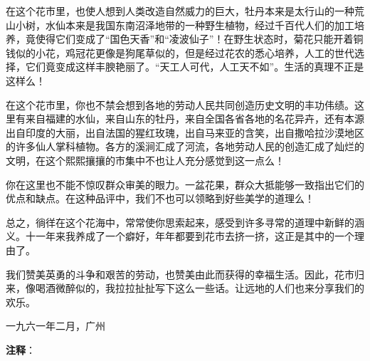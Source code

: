 \documentclass[12pt,UTF-8,openany]{ctexbook}
\begin{document}
\begin{large}
    在这个花市里，也使人想到人类改造自然威力的巨大，牡丹本来是太行山的一种荒山小树，水仙本来是我国东南沼泽地带的一种野生植物，经过千百代人们的加工培养，竟使得它们变成了“国色天香”和“凌波仙子”！在野生状态时，菊花只能开着铜钱似的小花，鸡冠花更像是狗尾草似的，但是经过花农的悉心培养，人工的世代选择，它们竟变成这样丰腴艳丽了。“天工人可代，人工天不如”。生活的真理不正是这样么！
    
    在这个花市里，你也不禁会想到各地的劳动人民共同创造历史文明的丰功伟绩。这里有来自福建的水仙，来自山东的牡丹，来自全国各省各地的名花异卉，还有本源出自印度的大丽，出自法国的猩红玫瑰，出自马来亚的含笑，出自撒哈拉沙漠地区的许多仙人掌科植物。各方的溪涧汇成了河流，各地劳动人民的创造汇成了灿烂的文明，在这个熙熙攘攘的市集中不也让人充分感觉到这一点么！
    
    你在这里也不能不惊叹群众审美的眼力。一盆花果，群众大抵能够一致指出它们的优点和缺点。在这种品评中，我们不也可以领略到好些美学的道理么！
    
    总之，徜徉在这个花海中，常常使你思索起来，感受到许多寻常的道理中新鲜的涵义。十一年来我养成了一个癖好，年年都要到花市去挤一挤，这正是其中的一个理由了。
    
    我们赞美英勇的斗争和艰苦的劳动，也赞美由此而获得的幸福生活。因此，花市归来，像喝酒微醉似的，我拉拉扯扯写下这么一些话。让远地的人们也来分享我们的欢乐。
    
    \hfill 一九六一年二月，广州
    
\end{large}


\newpage

\textbf{注释}：

\vspace{-1em}
\end{document}
